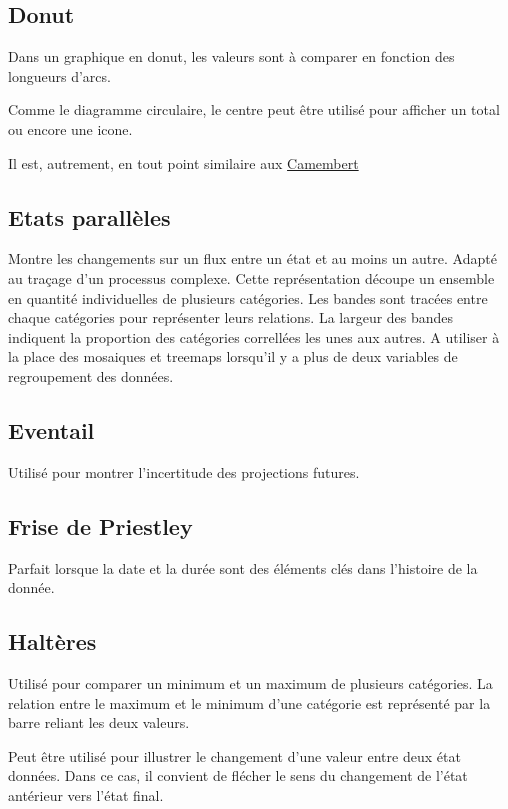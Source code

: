 \documentclass[a4paper,12pt]{article}
\begin{document}
\begin{multicols}{2}
\subsection*{Donut}
\label{sec:org90012f0}
Dans un graphique en donut, les valeurs sont à comparer en fonction des longueurs d'arcs.

Comme le diagramme circulaire, le centre peut être utilisé pour afficher un total ou encore une icone. \autocite{alansmithLexiqueVisuel}

Il est, autrement, en tout point similaire aux \hyperref[sec:orga10f57e]{Camembert}
\subsection*{Etats parallèles}
\label{sec:org7a8a310}
Montre les changements sur un flux entre un état et au moins un autre. Adapté au traçage d'un processus complexe. \autocite{alansmithLexiqueVisuel}
Cette représentation découpe un ensemble en quantité individuelles de plusieurs catégories. Les bandes sont tracées entre chaque catégories pour représenter leurs relations. La largeur des bandes indiquent la proportion des catégories correllées les unes aux autres. \autocite{wilkeVisualizingNestedProportions2019}
A utiliser à la place des mosaiques et treemaps lorsqu'il y a plus de deux variables de regroupement des données. \autocite{wilkeDirectoryVisualizations2019}
\subsection*{Eventail}
\label{sec:org54413d1}
Utilisé pour montrer l'incertitude des projections futures. \autocite{alansmithLexiqueVisuel}
\subsection*{Frise de Priestley}
\label{sec:org9a257eb}
Parfait lorsque la date et la durée sont des éléments clés dans l'histoire de la donnée. \autocite{alansmithLexiqueVisuel}
\subsection*{Haltères}
\label{sec:org86bf972}
Utilisé pour comparer un minimum et un maximum de plusieurs catégories. \autocite{alansmithLexiqueVisuel} La relation entre le maximum et le minimum d'une catégorie est représenté par la barre reliant les deux valeurs. \autocite{mikeyiHowChooseRight2020}

Peut être utilisé pour illustrer le changement d'une valeur entre deux état données. Dans ce cas, il convient de flécher le sens du changement de l'état antérieur vers l'état final.


\end{multicols}
\end{document}
